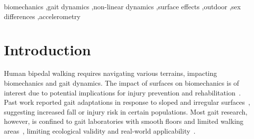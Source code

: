 \documentclass[authoryear,preprint,review,12pt]{elsarticle}
\begin{document}
\begin{frontmatter}

\begin{keyword}
biomechanics \sep gait dynamics \sep non-linear dynamics \sep surface effects \sep outdoor \sep sex differences \sep accelerometry


\end{keyword}

\end{frontmatter}

\section{Introduction}
\label{intro}
Human bipedal walking requires navigating various terrains, impacting biomechanics and gait dynamics. The impact of surfaces on biomechanics is of interest due to potential implications for injury prevention and rehabilitation~\citep{svenningsen_narrative_2020, schutte2016surface}. Past work reported gait adaptations in response to sloped and irregular surfaces~\citep{vieira_gait_2017, dixon_late-cueing_2018, schutte2016surface}, suggesting increased fall or injury risk in certain populations. Most gait research, however, is confined to gait laboratories with smooth floors and limited walking areas~\citep{svenningsen_narrative_2020, menz_acceleration_2003, dixon_aging_2018, dixon_late-cueing_2018, hunter_application_2023, maclellan_adaptations_2006, vieira_gait_2017, kent2019changes}, limiting ecological validity and real-world applicability~\citep{dillon2022impact}. 
\end{document}

